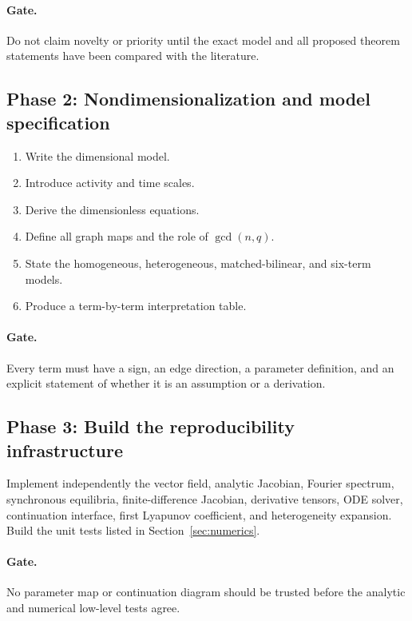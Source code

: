 \documentclass[11pt, reqno]{amsart}
\theoremstyle{definition}
\theoremstyle{remark}
\begin{document}
\paragraph{Gate.}
Do not claim novelty or priority until the exact model and all proposed theorem
statements have been compared with the literature.

\subsection{Phase 2: Nondimensionalization and model specification}

\begin{enumerate}[label=2.\arabic*,leftmargin=3em]
    \item Write the dimensional model.
    \item Introduce activity and time scales.
    \item Derive the dimensionless equations.
    \item Define all graph maps and the role of $\gcd(n,q)$.
    \item State the homogeneous, heterogeneous, matched-bilinear, and six-term
    models.
    \item Produce a term-by-term interpretation table.
\end{enumerate}

\paragraph{Gate.}
Every term must have a sign, an edge direction, a parameter definition, and an
explicit statement of whether it is an assumption or a derivation.

\subsection{Phase 3: Build the reproducibility infrastructure}

Implement independently the vector field, analytic Jacobian, Fourier spectrum,
synchronous equilibria, finite-difference Jacobian, derivative tensors, ODE
solver, continuation interface, first Lyapunov coefficient, and heterogeneity
expansion.  Build the unit tests listed in Section~\ref{sec:numerics}.

\paragraph{Gate.}
No parameter map or continuation diagram should be trusted before the analytic
and numerical low-level tests agree.
\end{document}
